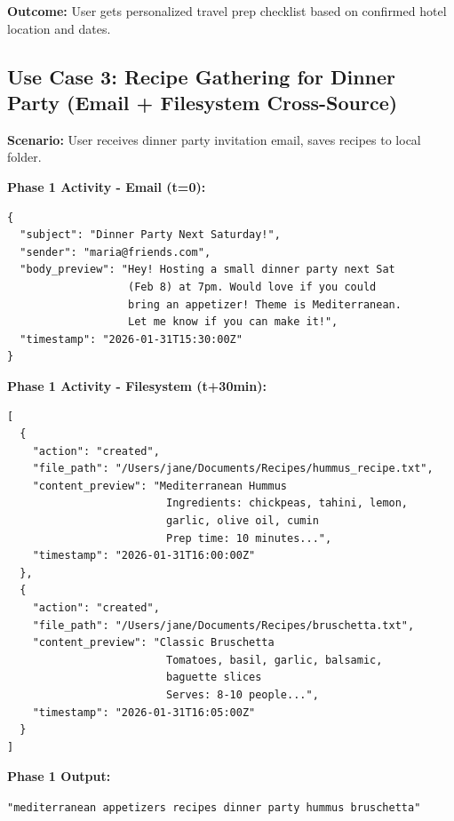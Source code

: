\documentclass[11pt,a4paper]{article}
\begin{document}
\textbf{Outcome:} User gets personalized travel prep checklist based on confirmed hotel location and dates.

\subsection{Use Case 3: Recipe Gathering for Dinner Party (Email + Filesystem Cross-Source)}

\textbf{Scenario:} User receives dinner party invitation email, saves recipes to local folder.

\textbf{Phase 1 Activity - Email (t=0):}
\begin{tcolorbox}[colback=gray!5,colframe=gray!80]
\begin{verbatim}
{
  "subject": "Dinner Party Next Saturday!",
  "sender": "maria@friends.com",
  "body_preview": "Hey! Hosting a small dinner party next Sat 
                   (Feb 8) at 7pm. Would love if you could 
                   bring an appetizer! Theme is Mediterranean. 
                   Let me know if you can make it!",
  "timestamp": "2026-01-31T15:30:00Z"
}
\end{verbatim}
\end{tcolorbox}

\textbf{Phase 1 Activity - Filesystem (t+30min):}
\begin{tcolorbox}[colback=gray!5,colframe=gray!80]
\begin{verbatim}
[
  {
    "action": "created",
    "file_path": "/Users/jane/Documents/Recipes/hummus_recipe.txt",
    "content_preview": "Mediterranean Hummus
                         Ingredients: chickpeas, tahini, lemon, 
                         garlic, olive oil, cumin
                         Prep time: 10 minutes...",
    "timestamp": "2026-01-31T16:00:00Z"
  },
  {
    "action": "created",
    "file_path": "/Users/jane/Documents/Recipes/bruschetta.txt",
    "content_preview": "Classic Bruschetta
                         Tomatoes, basil, garlic, balsamic, 
                         baguette slices
                         Serves: 8-10 people...",
    "timestamp": "2026-01-31T16:05:00Z"
  }
]
\end{verbatim}
\end{tcolorbox}

\textbf{Phase 1 Output:}
\begin{tcolorbox}[colback=blue!5,colframe=blue!80]
\texttt{"mediterranean appetizers recipes dinner party hummus bruschetta"}
\end{tcolorbox}
\end{document}
